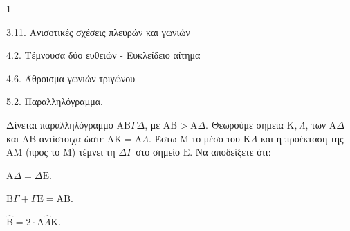 \begin{ylh}{1}
    \item 3.11. Ανισοτικές σχέσεις πλευρών και γωνιών
    \item 4.2. Τέμνουσα δύο ευθειών - Ευκλείδειο αίτημα
    \item 4.6. Άθροισμα γωνιών τριγώνου
    \item 5.2. Παραλληλόγραμμα.
\end{ylh}
Δίνεται παραλληλόγραμμο $\mathrm{A}\mathrm{B}\Gamma\Delta$, με $\mathrm{A}\mathrm{B} > \mathrm{A}\Delta$. Θεωρούμε σημεία $\mathrm{K}, \Lambda$, των $\mathrm{A}\Delta$ και $\mathrm{A}\mathrm{B}$ αντίστοιχα ώστε $\mathrm{A}\mathrm{K} = \mathrm{A}\Lambda$. Έστω $\mathrm{M}$ το μέσο του $\mathrm{K}\Lambda$ και η προέκταση της $\mathrm{A}\mathrm{M}$ (προς το $\mathrm{M}$) τέμνει τη $\Delta\Gamma$ στο σημείο $\mathrm{E}$.
Να αποδείξετε ότι:
\begin{alist}
    \item $\mathrm{A}\Delta = \Delta\mathrm{E}$. 
    \item $\mathrm{B}\Gamma + \Gamma\mathrm{E} = \mathrm{A}\mathrm{B}$. 
    \item $\hat{\mathrm{B}} = 2 \cdot \mathrm{A}\hat{\Lambda}\mathrm{K}$. 
\end{alist}

